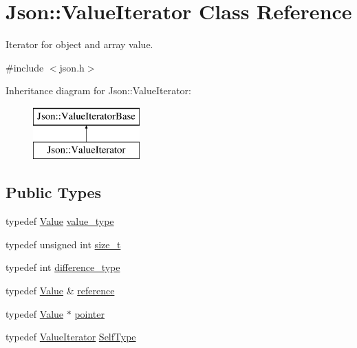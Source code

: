 \hypertarget{classJson_1_1ValueIterator}{}\section{Json\+:\+:Value\+Iterator Class Reference}
\label{classJson_1_1ValueIterator}


Iterator for object and array value.  




{\ttfamily \#include $<$json.\+h$>$}

Inheritance diagram for Json\+:\+:Value\+Iterator\+:\begin{figure}[H]
\begin{center}
\leavevmode
\includegraphics[height=2.000000cm]{classJson_1_1ValueIterator}
\end{center}
\end{figure}
\subsection*{Public Types}
\begin{DoxyCompactItemize}
\item 
typedef \hyperlink{classJson_1_1Value}{Value} \hyperlink{classJson_1_1ValueIterator_a2c5ba7be611f05546530c8a88b2d2e37_a2c5ba7be611f05546530c8a88b2d2e37}{value\+\_\+type}
\item 
typedef unsigned int \hyperlink{classJson_1_1ValueIterator_a308b8932ffc83eaa9d12dadd5c11a7dd_a308b8932ffc83eaa9d12dadd5c11a7dd}{size\+\_\+t}
\item 
typedef int \hyperlink{classJson_1_1ValueIterator_a2be1a9aa60bbfc8812e9dd1a7f1a8786_a2be1a9aa60bbfc8812e9dd1a7f1a8786}{difference\+\_\+type}
\item 
typedef \hyperlink{classJson_1_1Value}{Value} \& \hyperlink{classJson_1_1ValueIterator_ae87929b4567aa00372cf602c43b57160_ae87929b4567aa00372cf602c43b57160}{reference}
\item 
typedef \hyperlink{classJson_1_1Value}{Value} $\ast$ \hyperlink{classJson_1_1ValueIterator_acec45feb1ef1f3bf81240157d06d5432_acec45feb1ef1f3bf81240157d06d5432}{pointer}
\item 
typedef \hyperlink{classJson_1_1ValueIterator}{Value\+Iterator} \hyperlink{classJson_1_1ValueIterator_a23357670fdad61792670d86f62db7e16_a23357670fdad61792670d86f62db7e16}{Self\+Type}
\end{DoxyCompactItemize}
